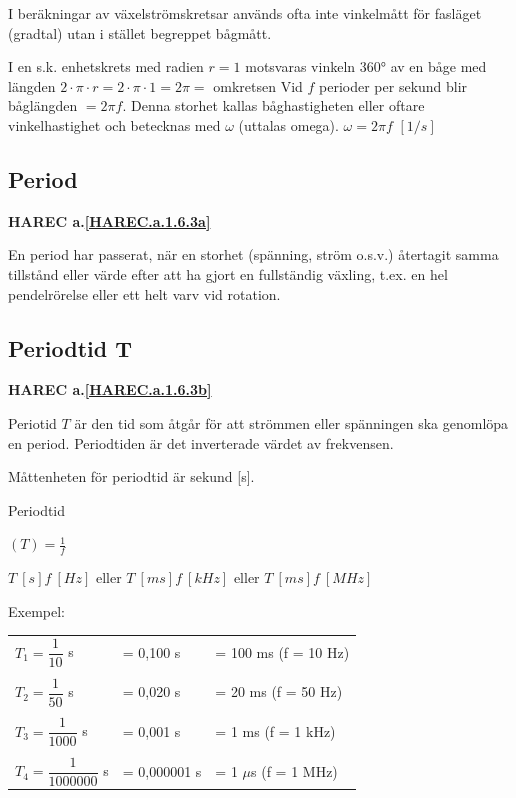 I beräkningar av växelströmskretsar används ofta inte vinkelmått för fasläget
(gradtal) utan i stället begreppet bågmått.

I en s.k. enhetskrets med radien \(r = 1\) motsvaras vinkeln 360° av en båge med
längden \(2 \cdot \pi \cdot r= 2 \cdot \pi \cdot 1 = 2 \pi =\) omkretsen
Vid \(f\) perioder per sekund blir båglängden \(= 2\pi f\). Denna storhet
kallas båghastigheten eller oftare vinkelhastighet och betecknas med \(\omega\)
(uttalas omega).
\(\omega= 2\pi f\) \([1/s]\)

\subsection{Period}
\textbf{HAREC a.\ref{HAREC.a.1.6.3a}\label{myHAREC.a.1.6.3a}}

En period har passerat, när en storhet (spänning, ström o.s.v.) återtagit samma
tillstånd eller värde efter att ha gjort en fullständig växling, t.ex. en hel
pendelrörelse eller ett helt varv vid rotation.

\subsection{Periodtid T}
\textbf{HAREC a.\ref{HAREC.a.1.6.3b}\label{myHAREC.a.1.6.3b}}

Periotid \(T\) är den tid som åtgår för att strömmen eller spänningen ska
genomlöpa en period. Periodtiden är det inverterade värdet av frekvensen.

Måttenheten för periodtid är sekund [s].

Periodtid

\((T) = \frac{1}{f}\)

\(T\ [s]  f\ [Hz]\) eller
\(T\ [ms] f\ [kHz]\) eller
\(T\ [ms] f\ [MHz]\)

Exempel:

\begin{center}
\begin{tabular}{lll}
\(T_1=\dfrac{1}{10}\) s & = 0,100 s & = 100 ms (f = 10 Hz)\\
\\
\(T_2=\dfrac{1}{50}\) s & = 0,020 s & = 20 ms (f = 50 Hz)\\
\\
\(T_3=\dfrac{1}{1000}\) s & = 0,001 s & = 1 ms (f = 1 kHz)\\
\\
\(T_4=\dfrac{1}{1000000}\) s & = 0,000001 s & = 1 \(\mu\)s (f = 1 MHz)\\
\end{tabular}
\end{center}

